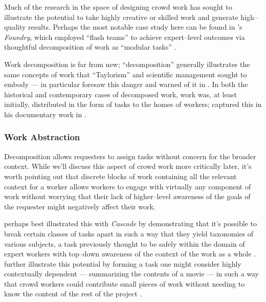 \documentclass{sigchi}
\begin{document}
Much of the research in the space of designing crowd work has
sought to illustrate the potential to take highly creative or skilled work
and generate high--quality results.
Perhaps the most notable case study here can be found in
\citeauthor{foundry}'s \textit{Foundry}, which employed
``flash teams'' to achieve expert--level outcomes via thoughtful
decomposition of work as ``modular tasks''
\cite{foundry}.

Work decomposition is far from new;
``decomposition'' generally illustrates the same concepts of work that ``Taylorism''
and scientific management sought to embody
---
\citeauthor{silberman2010ethics} in particular foresaw this danger and warned of it in
\citeyear{silberman2010ethics}
\cite{crowdworkFuture,silberman2010ethics,nickerson2013crowd}.
In both the historical and contemporary cases of decomposed work,
work was,
at least initially,
distributed in the form of tasks to the homes of workers;
\citeauthor{riisOtherSideLives} captured this in his documentary work
in \citeyear{riisOtherSideLives}
\cite{riisOtherSideLives}.



\subsubsection{Work Abstraction}\label{sec:workAbstraction}
Decomposition allows requesters to assign tasks without concern for the broader context.
While we'll discuss this aspect of crowd work more critically later,
it's worth pointing out that discrete blocks of work containing all the relevant context for a worker
allows workers to engage with virtually any component of work without worrying that their lack of 
higher--level awareness of the goals of the requester might negatively affect their work.

\citeauthor{chilton2013cascade} perhaps best illustrated this with
\textit{Cascade} by demonstrating that it's possible to
break certain classes of tasks apart
in such a way that they yield taxonomies of various subjects,
a task previously thought to be safely within the domain of expert workers
with top--down awareness of the context of the work as a whole
\cite{chilton2013cascade}.
\citeauthor{verroios2014context} further illustrate this potential by
forming a task one might consider highly contextually dependent
--- summarizing the contents of a movie ---
in such a way that crowd workers could contribute small pieces of work without
needing to know the content of the rest of the project
\cite{verroios2014context}.
\end{document}
